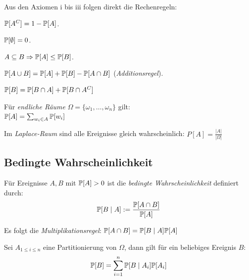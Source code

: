 Aus den Axiomen i bis iii folgen direkt die Rechenregeln:
\begin{compactenum}[i:]
	\item \(\P[A^C] = 1 - \P[A]\).
	\item \(\P[\emptyset] = 0\).
	\item \(A \subseteq B \Rightarrow \P[A] \leq \P[B]\).
	\item \(\P[A \cup B] = \P[A]+\P[B]-\P[A \cap B]\) (\emph{Additionsregel}).
	\item \(\P[B] = \P[B \cap A] + \P[B \cap A^C]\)
\end{compactenum}

\begin{definition}
	Für \emph{endliche Räume} \(\Omega = \{\omega_1,\ldots,\omega_n\}\) gilt:\\
	\(\P[A] = \sum_{ w_i \in A} \P[w_i]\)
\end{definition}

\begin{definition}
	Im \emph{Laplace-Raum} sind alle Ereignisse gleich wahrscheinlich:
	\(P[A] = \frac{\lvert A \rvert}{\lvert \Omega \rvert}\)
\end{definition}



\subsection{Bedingte Wahrscheinlichkeit}

\begin{definition}
	Für Ereignisse \(A,B\) mit \(\P[A] > 0\) ist die \emph{bedingte Wahrscheinlichkeit} definiert durch:
	\[
		\P[B \mid A] := \frac{\P[A \cap B]}{\P[A]}
	\]
\end{definition}

Es folgt die \emph{Multiplikationsregel}:
\(\P[A \cap B] = \P[B \mid A] \P[A]\)

\begin{theorem}
	Sei \(A_{1 \leq i \leq n}\) eine Partitionierung von \(\Omega\), dann gilt für ein beliebiges Ereignis \(B\):
	\[
		\P[B] = \sum_{i=1}^n \P[B \mid A_i]\P[A_i]
	\]
\end{theorem}

